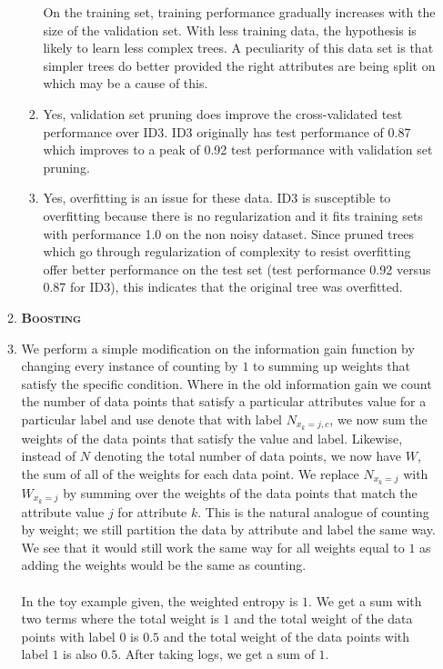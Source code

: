\documentclass[12pt,letterpaper]{article}
\newcounter{problemnumber}
\newcounter{partnumber}
\newcommand{\Problem}{\stepcounter{problemnumber}\setcounter{partnumber}{0}\item[\makebox{\hfil\textbf{\ \theproblemnumber.}\hfil}]}
\newcommand{\Part}{\stepcounter{partnumber}\item[(\alph{partnumber})]}
\begin{document}
\begin{enumerate}
\begin{enumerate}
\begin{enumerate}[ref=(\roman{*})]
        On the training set, training performance gradually increases with the size of the validation set. With less training data, the hypothesis is likely to learn less complex trees. A peculiarity of this data set is that simpler trees do better provided the right attributes are being split on which may be a cause of this.       \\
        \item
        Yes, validation set pruning does improve the cross-validated test performance over ID3. ID3 originally has test performance of 0.87 which improves to a peak of 0.92 test performance with validation set pruning.\\

        \item
        Yes, overfitting is an issue for these data. ID3 is susceptible to overfitting because there is no regularization and it fits training sets with performance 1.0 on the non noisy dataset. Since pruned trees which go through regularization of complexity to resist overfitting offer better performance on the test set (test performance 0.92 versus 0.87 for ID3), this indicates that the original tree was overfitted.\\

        \end{enumerate}
     \Problem \textbf{\textsc{Boosting}}
         \Part We perform a simple modification on the information gain function by changing every instance of counting by $1$ to summing up weights that satisfy the specific condition.  Where in the old information gain we count the number of data points that satisfy a particular attributes value for a particular label and use denote that with label $N_{x_k=j,c}$, we now sum the weights of the data points that satisfy the value and label. Likewise, instead of $N$ denoting the total number of data points, we now have $W$, the sum of all of the weights for each data point. We replace $N_{x_k=j}$ with $W_{x_k=j}$ by summing over the weights of the data points that match the attribute value $j$ for attribute $k$. This is the natural analogue of counting by weight; we still partition the data by attribute and label the same way. We see that it would still work the same way for all weights equal to $1$ as adding the weights would be the same as counting.\\ \\
        In the toy example given, the weighted entropy is $1$. We get a sum with two terms where the total weight is $1$ and the total weight of the data points with label $0$ is $0.5$ and the total weight of the data points with label $1$ is also $0.5$. After taking logs, we get a sum of $1$.\\


\end{enumerate}
\end{enumerate}
\end{document}
